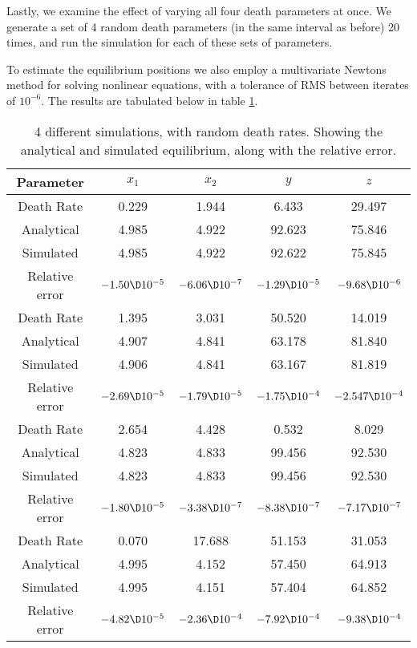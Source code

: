 \documentclass[a4paper,10pt]{article}
\begin{document}
	Lastly, we examine the effect of varying all four death parameters at once. We generate a set of 4 random death parameters (in the same interval as before) 20 times, and run the simulation for each of these sets of parameters.
	
	To estimate the equilibrium positions we also employ a multivariate Newtons method for solving nonlinear equations, with a tolerance of RMS between iterates of $ 10^{-6} $. The results are tabulated below in table \ref{tab:deaths}.
	
	\begin{table}[H]
		\centering
		\begin{tabular}{c|c|c|c|c}
			Parameter & $ x_1 $ & $ x_2 $ & $ y $ & $ z $ \\
			\hline
			\hline
			Death Rate & 0.229 & 1.944 & 6.433 & 29.497  \\
			Analytical & 4.985 & 4.922 & 92.623 & 75.846  \\
			Simulated & 4.985 & 4.922 & 92.622 & 75.845  \\
			Relative error & $ -1.50\D10^{-5} $ & $ -6.06\D10^{-7} $ & $ -1.29\D10^{-5} $ & $ -9.68\D10^{-6} $ \\
			\hline
			\hline
			Death Rate & 1.395 & 3.031 & 50.520 & 14.019  \\
			Analytical & 4.907 & 4.841 & 63.178 & 81.840  \\
			Simulated & 4.906 & 4.841 & 63.167 & 81.819  \\
			Relative error & $-2.69\D10^{-5}$ & $-1.79\D10^{-5}$ & $-1.75\D10^{-4}$ & $-2.547\D10^{-4}$  \\
			\hline
			\hline
			Death Rate & 2.654 & 4.428 & 0.532 & 8.029  \\
			Analytical & 4.823 & 4.833 & 99.456 & 92.530  \\
			Simulated & 4.823 & 4.833 & 99.456 & 92.530  \\
			Relative error & $-1.80\D10^{-5}$ & $-3.38\D10^{-7}$ & $-8.38\D10^{-7}$ & $-7.17\D10^{-7}$  \\
			\hline
			\hline
			Death Rate & 0.070 & 17.688 & 51.153 & 31.053  \\
			Analytical & 4.995 & 4.152 & 57.450 & 64.913  \\
			Simulated & 4.995 & 4.151 & 57.404 & 64.852  \\
			Relative error & $-4.82\D10^{-5}$ & $-2.36\D10^{-4}$ & $-7.92\D10^{-4}$ & $-9.38\D10^{-4}$
		\end{tabular}
	\caption{4 different simulations, with random death rates. Showing the analytical and simulated equilibrium, along with the relative error.}
	\label{tab:deaths}
	\end{table}
	
\end{document}
